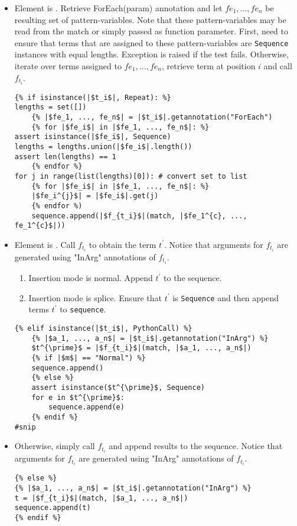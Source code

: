 \begin{itemize}
\item
Element is \TermRepeat.  Retrieve ForEach(param) annotation and let $fe_1, ..., fe_n$ be resulting set of pattern-variables. Note that these pattern-variables may be read from the match or simply passed as function parameter. First, need to ensure that terms that are assigned to these pattern-variables are \texttt{Sequence} instances with equal lengths. Exception is raised if the test fails. Otherwise, iterate over terms assigned to $fe_1, ..., fe_n$, retrieve term at position $i$ and call $f_{t_i}$.

\begin{verbatim}
{% if isinstance(|$t_i$|, Repeat): %}
lengths = set([])
	{% |$fe_1, ..., fe_n$| = |$t_i$|.getannotation("ForEach")
	{% for |$fe_i$| in |$fe_1, ..., fe_n$|: %}
assert isinstance(|$fe_i$|, Sequence)
lengths = lengths.union(|$fe_i$|.length())
assert len(lengths) == 1
	{% endfor %}
for j in range(list(lengths)[0]): # convert set to list 
	{% for |$fe_i$| in |$fe_1, ..., fe_n$|: %}
	|$fe_i^{j}$| = |$fe_i$|.get(j)
	{% endfor %)
	sequence.append(|$f_{t_i}$|(match, |$fe_1^{c}, ..., fe_1^{c}$|))
\end{verbatim}
\item
Element is \PythonCall. Call $f_{t_i}$  to obtain the term $t^{\prime}$. Notice that arguments for $f_{t_i}$ are generated using "InArg" annotations of $f_{t_i}$. 
	\begin{enumerate}
	\item Insertion mode is normal. Append $t^{\prime}$ to the sequence.
	\item Insertion mode is splice. Ensure that $t^{\prime}$ is \texttt{Sequence} and then append terms $t^{\prime}$ to \texttt{sequence}.
	\end{enumerate}

\begin{verbatim}
{% elif isinstance(|$t_i$|, PythonCall) %}
	{% |$a_1, ..., a_n$| = |$t_i$|.getannotation("InArg") %}
	$t^{\prime}$ = |$f_{t_i}$|(match, |$a_1, ..., a_n$|)
	{% if |$m$| == "Normal") %}
	sequence.append()
	{% else %}
	assert isinstance($t^{\prime}$, Sequence)
	for e in $t^{\prime}$:
		sequence.append(e)
	{% endif %}
#snip
\end{verbatim}

\item Otherwise, simply call $f_{t_i}$ and append results to the sequence. Notice that arguments for $f_{t_i}$ are generated using "InArg" annotations of $f_{t_i}$. 

\begin{verbatim}
{% else %}
{% |$a_1, ..., a_n$| = |$t_i$|.getannotation("InArg") %}
t = |$f_{t_i}$|(match, |$a_1, ..., a_n$|)
sequence.append(t)
{% endif %}
\end{verbatim}
\end{itemize}

